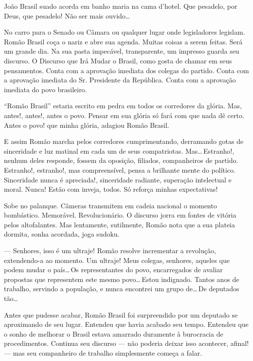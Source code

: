 João Brasil suado acorda em banho maria na cama d'hotel. Que pesadelo, por Deus, que pesadelo! Não ser mais ouvido\ldots



No carro para o Senado ou Câmara ou qualquer lugar onde legisladores legislam. Romão Brasil coça o nariz e abre sua agenda. Muitas coisas a serem feitas. Será um grande dia. Na sua pasta impecável, transparente, um impresso guarda seu discurso. O Discurso que Irá Mudar o Brasil, como gosta de chamar em seus pensamentos. Conta com a aprovação imediata dos colegas do partido. Conta com a aprovação imediata do Sr. Presidente da República. Conta com a aprovação imediata do povo brasileiro.

``Romão Brasil'' estaria escrito em pedra em todos os corredores da glória. Mas, antes!, antes!, antes o povo. Pensar em sua glória só fará com que nada dê certo. Antes o povo! que minha glória, adagiou Romão Brasil.

E assim Romão marcha pelos corredores cumprimentando, derramando gotas de sinceridade e luz matinal em cada um de seus compatriotas. Mas\ldots\,Estranho!, nenhum deles responde, fossem da oposição, filiados, companheiros de partido. Estranho!, estranho!, mas compreensível, pensa a brilhante mente do político. Sinceridade nunca é apreciada!, sinceridade radiante, superação intelectual e moral. Nunca! Estão com inveja, todos. Só reforça minhas expectativas!

Sobe no palanque. Câmeras transmitem em cadeia nacional o momento bombástico. Memorável. Revolucionário. O discurso jorra em fontes de vitória pelos altofalantes. Mas lentamente, sutilmente, Romão nota que a sua plateia dormita, sonha acordada, joga sudoku.

--- Senhores, isso é um ultraje! Romão resolve incrementar a revolução, extendendo-a ao momento. Um ultraje! Meus colegas, senhores, aqueles que podem mudar o país\ldots\,Os representantes do povo, encarregados de avaliar propostas que representem este mesmo povo\ldots\,Estou indignado. Tantos anos de trabalho, servindo a população, e nunca encontrei um grupo de\ldots\,De deputados tão\ldots

Antes que pudesse acabar, Romão Brasil foi surpreendido por um deputado se aproximando de seu lugar. Entendeu que havia acabado seu tempo. Entendeu que o sonho de melhorar o Brasil estava amarrado duramente à burocracia de procedimentos. Continua seu discurso --- não poderia deixar isso acontecer, afinal! --- mas seu companheiro de trabalho simplesmente começa a falar.

